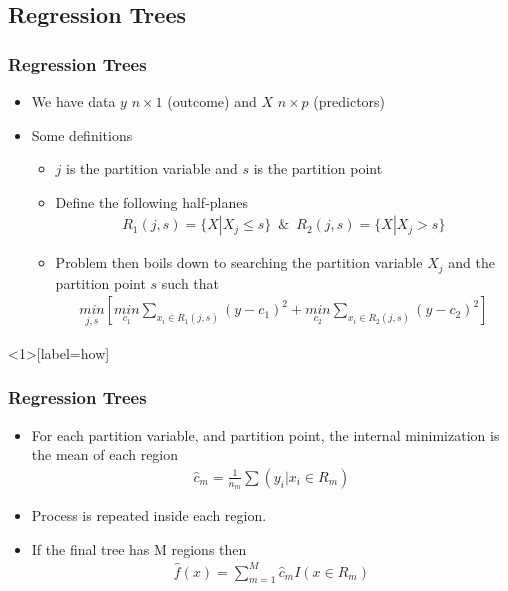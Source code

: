 \documentclass[
  shownotes,
  xcolor={svgnames},
  hyperref={colorlinks,citecolor=DarkBlue,linkcolor=DarkRed,urlcolor=DarkBlue}
  , aspectratio=169]{beamer}
\begin{document}
\subsection{Regression Trees}
\begin{frame}[fragile]
\frametitle{Regression Trees}

\begin{itemize}
\item We have data $y$ $n\times 1$ (outcome) and $X$ $n\times p$ (predictors)
\item Some definitions
\begin{itemize}
\item $j$ is the partition variable and $s$ is the partition point
\item Define the following half-planes
\begin{align}
R_1(j,s)=\{X|X_j\leq s\} \,\,\, \& \,\,\, R_2(j,s)=\{X|X_j>  s\}
\end{align}
\item Problem then boils down to searching the partition variable $X_j$ and the partition point $s$ such that
\begin{align}
\underset{j,s}{min} \left[ \underset{c_1}{min}\sum_{x_i\in R_1(j,s)}(y-c_1)^2+ \underset{c_2}{min}\sum_{x_i\in R_2(j,s)}(y-c_2)^2\right]
\end{align}
\end{itemize}
\end{itemize}
\end{frame}
\begin{frame}<1>[label=how]
\frametitle{Regression Trees}

\begin{itemize}
\item For each partition variable, and partition point, the internal minimization is the mean of each region
\begin{align}
 \hat{c}_m =\frac{1}{n_m} \sum(y_i|x_i \in R_m)
\end{align}
\item Process is repeated inside each region. 
\pause
\item If the final tree has M regions then 
\begin{align}
\hat{f}(x) = \sum_{m=1}^M \hat{c}_m I(x \in R_m)
\end{align}

\end{itemize}

\end{frame}
\end{document}
